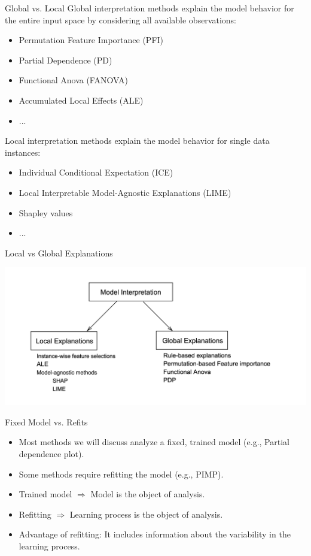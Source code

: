 \documentclass[11pt,compress,t,notes=noshow, aspectratio=169, xcolor=table]{beamer}
\begin{document}
\begin{frame}{Global vs. Local}
Global interpretation methods explain the model behavior for the entire input space by considering all available observations:
	\begin{itemize}
		\item Permutation Feature Importance (PFI)
		\item Partial Dependence (PD)
		\item Functional Anova (FANOVA)
		\item Accumulated Local Effects (ALE)
		\item ...
	\end{itemize}
\bigskip
Local interpretation methods explain the model behavior for single data instances:
	\begin{itemize}
		\item Individual Conditional Expectation (ICE)
		\item Local Interpretable Model-Agnostic Explanations (LIME)
		\item Shapley values
		\item ...
	\end{itemize}
\end{frame}

\begin{frame}{Local vs Global Explanations}
	\begin{center}
		\includegraphics[width=\textwidth]{figure/1-local-global.png}
	\end{center}
\end{frame}


\begin{frame}{Fixed Model vs. Refits}
	\begin{itemize}
		\itemsep1em
		\item Most methods we will discuss analyze a fixed, trained model (e.g., Partial dependence plot).
		\item Some methods require refitting the model (e.g., PIMP).
		\item Trained model $\Rightarrow$ Model is the object of analysis.
		\item Refitting $\Rightarrow$ Learning process is the object of analysis.
		\item Advantage of refitting: It includes information about the variability in the learning process.
	\end{itemize}
\end{frame}
\end{document}
